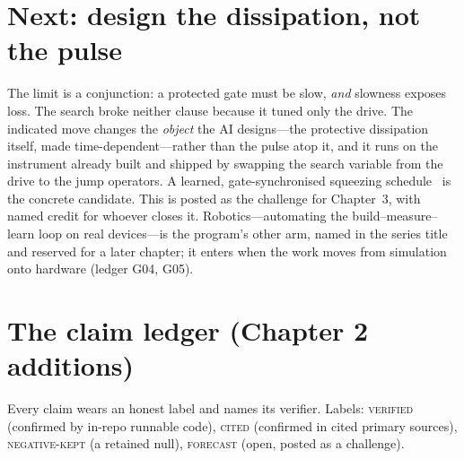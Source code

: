 \documentclass[11pt]{article}
\begin{document}
\section{Next: design the dissipation, not the pulse}
The limit is a conjunction: a protected gate must be slow, \emph{and} slowness exposes loss.
The search broke neither clause because it tuned only the drive. The indicated move changes the
\emph{object} the AI designs---the protective dissipation itself, made time-dependent---rather
than the pulse atop it, and it runs on the instrument already built and shipped by swapping the
search variable from the drive to the jump operators. A learned, gate-synchronised squeezing
schedule~\cite{squeezedcat} is the concrete candidate. This is posted as the challenge for
Chapter~3, with named credit for whoever closes it. Robotics---automating the
build--measure--learn loop on real devices---is the program's other arm, named in the series
title and reserved for a later chapter; it enters when the work moves from simulation onto
hardware (ledger G04, G05).

\section{The claim ledger (Chapter 2 additions)}
Every claim wears an honest label and names its verifier. Labels: \textsc{verified} (confirmed
by in-repo runnable code), \textsc{cited} (confirmed in cited primary sources),
\textsc{negative-kept} (a retained null), \textsc{forecast} (open, posted as a challenge).
\end{document}
